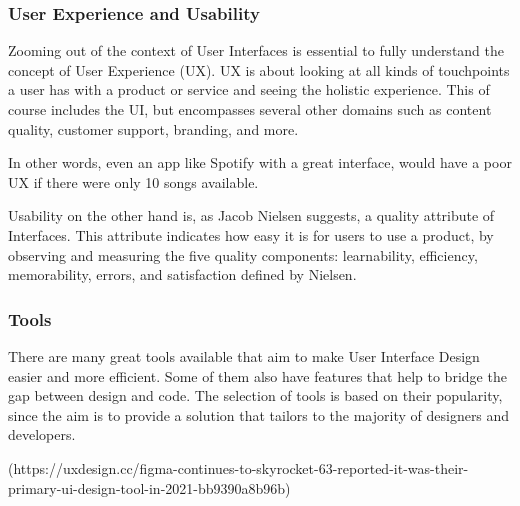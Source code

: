 \subsubsection{User Experience and Usability}
Zooming out of the context of User Interfaces is essential to fully understand the concept of User
Experience (UX). UX is about looking at all kinds of touchpoints a user has with a product or
service and seeing the holistic experience. This of course includes the UI, but encompasses several
other domains such as content quality, customer support, branding, and more.

In other words, even an app like Spotify with a great interface, would have a poor UX if there were
only 10 songs available.

Usability on the other hand is, as Jacob Nielsen suggests, a quality attribute of Interfaces. This
attribute indicates how easy it is for users to use a product, by observing and measuring the five
quality components: learnability, efficiency, memorability, errors, and satisfaction
defined by Nielsen. 

\subsubsection{Tools}
There are many great tools available that aim to make User Interface Design easier and more
efficient. Some of them also have features that help to bridge the gap between design and code. The
selection of tools is based on their popularity, since the aim is to provide a solution that
tailors to the majority of designers and developers.

(https://uxdesign.cc/figma-continues-to-skyrocket-63-reported-it-was-their-primary-ui-design-tool-in-2021-bb9390a8b96b)

